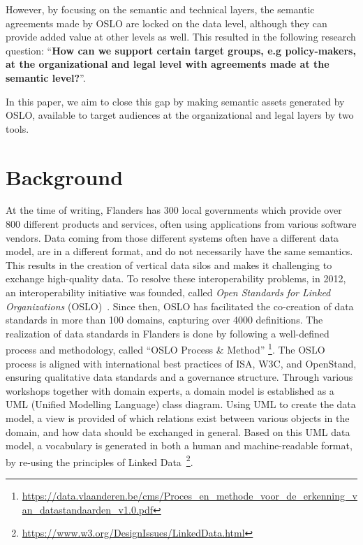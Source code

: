 \documentclass[manuscript]{acmart}
\begin{document}
However, by focusing on the semantic and technical layers, the semantic agreements made by OSLO are locked on the data level, although they can provide added value at other levels as well.
This resulted in the following research question: ``\textbf{How can we support certain target groups, e.g policy-makers, at the organizational and legal level with agreements made at the semantic level?}''.

In this paper, we aim to close this gap by making semantic assets generated by OSLO, available to target audiences at the organizational and legal layers by two tools.

\section{Background}

At the time of writing, Flanders has 300 local governments which provide over 800 different products and services, often using applications from various software vendors. 
Data coming from those different systems often have a different data model, are in a different format, and do not necessarily have the same semantics. 
This results in the creation of vertical data silos and makes it challenging to exchange high-quality data. 
To resolve these interoperability problems, in 2012, an interoperability initiative was founded, called \textit{Open Standards for Linked Organizations} (OSLO)~\cite{buyle2016oslo}.
Since then, OSLO has facilitated the co-creation of data standards in more than 100 domains, capturing over 4000 definitions. 
The realization of data standards in Flanders is done by following a well-defined process and methodology, called ``OSLO Process \& Method'' \footnote{\url{https://data.vlaanderen.be/cms/Proces_en_methode_voor_de_erkenning_van_datastandaarden_v1.0.pdf}}.
The OSLO process is aligned with international best practices of ISA, W3C, and OpenStand, ensuring qualitative data standards and a governance structure.
Through various workshops together with domain experts, a domain model is established as a UML (Unified Modelling Language) class diagram. 
Using UML to create the data model, a view is provided of which relations exist between various objects in the domain, and how data should be exchanged in general.
Based on this UML data model, a vocabulary is generated in both a human and machine-readable format, by re-using the principles of Linked Data~\footnote{\url{https://www.w3.org/DesignIssues/LinkedData.html}}.
\end{document}
